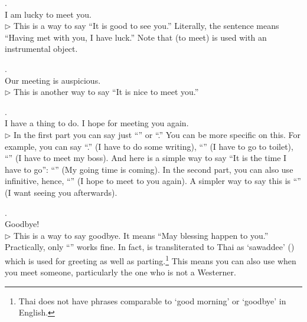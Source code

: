\medskip
{}. \\
\hspace*{12mm}I am lucky to meet you.\\
{\small $\triangleright$ This is a way to say ``It is good to see you.'' Literally, the sentence means ``Having met with you, I have luck.'' Note that  (to meet) is used with an instrumental object.}

\medskip
{}. \\
\hspace*{12mm}Our meeting is auspicious.\\
{\small $\triangleright$ This is another way to say ``It is nice to meet you.''}

\medskip
{}. \\
\hspace*{12mm}I have a thing to do. I hope for meeting you again.\\
{\small $\triangleright$ In the first part you can say just ``'' or ``.'' You can be more specific on this. For example, you can say ``.'' (I have to do some writing), ``'' (I have to go to toilet), ``'' (I have to meet my boss). And here is a simple way to say ``It is the time I have to go'': ``'' (My going time is coming). In the second part, you can also use infinitive, hence, ``'' (I hope to meet to you again). A simpler way to say this is ``'' (I want seeing you afterwards).}

\medskip
{}. \\
\hspace*{12mm}Goodbye!\\
{\small $\triangleright$ This is a way to say goodbye. It means ``May blessing happen to you.'' Practically, only ``'' works fine. In fact,  is transliterated to Thai as `sawaddee' () which is used for greeting as well as parting.\footnote{Thai does not have phrases comparable to `good morning' or `goodbye' in English.} This means you can also use  when you meet someone, particularly the one who is not a Westerner.}


